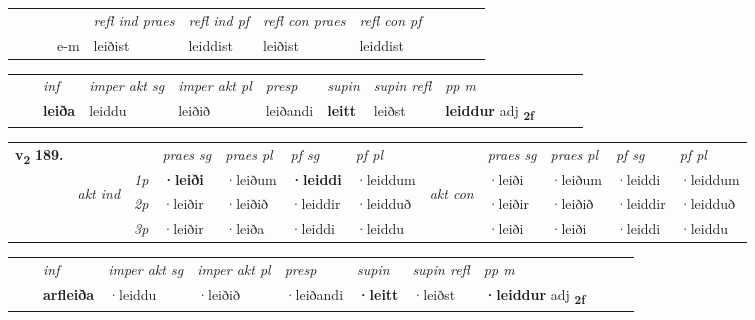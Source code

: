 \begin{tabular}{llllllllllll}
 & &  & &  \textit{refl ind praes} & \textit{refl ind pf} & \textit{refl con praes} & \textit{refl con pf} \\*
&  & & e-m & leiðist & leiddist & leiðist & leiddist \\*
\cmidrule{5-9}
\end{tabular}


\begin{tabular}{llllllllllll}
 & & \textit{inf} & \textit{imper akt sg} & \textit{imper akt pl}   & \textit{presp} & \textit{supin} & \textit{supin refl} & \textit{pp m}     \\*
  & & \textbf{leiða} & leiddu  & leiðið   & leiðandi &  \textbf{leitt} & leiðst & \textbf{leiddur} adj \textbf{\textsubscript{2f}} \\*
\cmidrule{1-12}
\end{tabular}



\begin{tabular}{llllllllllll} \toprule
\multirow{4}{*}{{{\textbf{v{\textsubscript{2}}} \Large{\textbf{189.}}}}}  & &   &  \textit{praes sg}  & \textit{praes pl}  &\textit{ pf sg} & \textit{pf pl} &  &  \textit{praes sg}  & \textit{praes pl}  & \textit{pf sg} & \textit{pf pl } \\*
	\cmidrule{4-7} \cmidrule{9-12}
 & \multirow{3}{*}{\begin{turn}{90}\textit{akt ind}\end{turn}} & {\textit{1p}} & \textbf{·leiði} & ·leiðum    & \textbf{·leiddi} & ·leiddum & \multirow{3}{*}{\begin{turn}{90}\textit{akt con}\end{turn}} &·leiði & ·leiðum & ·leiddi & ·leiddum\\*
& &  {\textit{2p}} &  ·leiðir  & ·leiðið   & ·leiddir & ·leidduð & & ·leiðir & ·leiðið & ·leiddir & ·leidduð \\*
& &  {\textit{3p}} & ·leiðir & ·leiða   & ·leiddi & ·leiddu & & ·leiði & ·leiði& ·leiddi & ·leiddu  \\*
\cmidrule{4-7} \cmidrule{9-12}
\end{tabular}


\begin{tabular}{llllllllllll}
 & & \textit{inf} & \textit{imper akt sg} & \textit{imper akt pl}   & \textit{presp} & \textit{supin} & \textit{supin refl} & \textit{pp m}     \\*
  & & \textbf{arfleiða} & ·leiddu  & ·leiðið   & ·leiðandi &  \textbf{·leitt} & ·leiðst & \textbf{·leiddur} adj \textbf{\textsubscript{2f}} \\*
\cmidrule{1-12}
\end{tabular}



